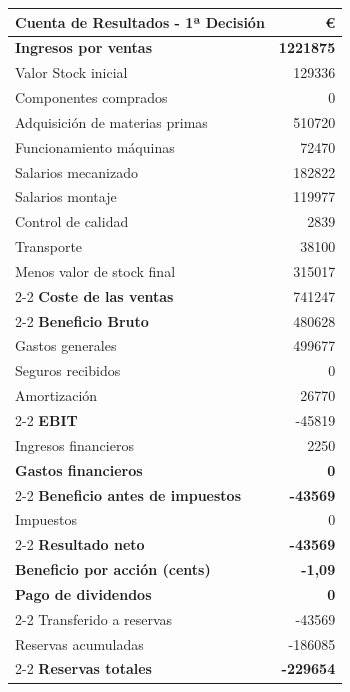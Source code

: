 \begin{table}[h]
    \centering
    \begin{tabular}{lr}
        \textbf{Cuenta de Resultados - 1ª Decisión} & \textbf{€} \\
        \hline
        \textbf{Ingresos por ventas}                & \textbf{1221875} \\
        Valor Stock inicial                         & 129336 \\
        Componentes comprados                       & 0 \\
        Adquisición de materias primas              & 510720 \\
        Funcionamiento máquinas                     & 72470 \\
        Salarios mecanizado                         & 182822 \\
        Salarios montaje                            & 119977 \\
        Control de calidad                          & 2839 \\
        Transporte                                  & 38100 \\
        Menos valor de stock final                  & 315017 \\
        \cline{2-2}
        \textbf{Coste de las ventas}                & 741247 \\
        \cline{2-2}
        \textbf{Beneficio Bruto}                    & 480628 \\
        Gastos generales                            & 499677 \\
        Seguros recibidos                           & 0 \\
        Amortización                                & 26770 \\
        \cline{2-2}
        \textbf{EBIT}                               & -45819 \\
        Ingresos financieros                        & 2250 \\
        \textbf{Gastos financieros}                 & \textbf{0} \\
        \cline{2-2}
        \textbf{Beneficio antes de impuestos}       & \textbf{-43569} \\
        Impuestos                                   & 0 \\
        \cline{2-2}
        \textbf{Resultado neto}                     & \textbf{-43569} \\
        \textbf{Beneficio por acción (cents)}       & \textbf{-1,09} \\
        \textbf{Pago de dividendos}                 & \textbf{0} \\
        \cline{2-2}
        Transferido a reservas                      & -43569 \\
        Reservas acumuladas                         & -186085 \\
        \cline{2-2}
        \textbf{Reservas totales}                   & \textbf{-229654}
    \end{tabular}
\end{table}

